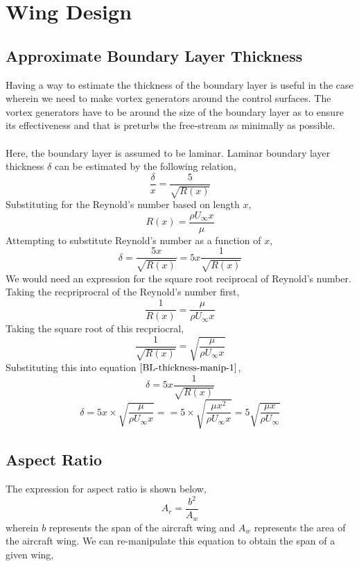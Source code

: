 \section{Wing Design}
\begin{comment}
\end{comment}

\subsection{Approximate Boundary Layer Thickness}
\begin{comment}
\end{comment}
Having a way to estimate the thickness of the boundary layer is useful in the case wherein we need to make vortex generators around the control surfaces. The vortex generators have to be around the size of the boundary layer as to ensure its effectiveness and that is preturbs the free-stream as minimally as possible.
\\~\\Here, the boundary layer is assumed to be laminar. Laminar boundary layer thickness $\delta$ can be estimated by the following relation,
$$\frac{\delta}{x} = \frac{5}{\sqrt{R(x)}}$$
Substituting for the Reynold's number based on length $x$,
$$R(x) = \frac{\rho U_{\infty} x}{\mu}$$
Attempting to substitute Reynold's number as a function of $x$,
\begin{equation}\delta = \frac{5x}{\sqrt{R(x)}} = 5x\frac{1}{\sqrt{R(x)}} \label{BL-thickness-manip-1}\end{equation}
We would need an expression for the square root reciprocal of Reynold's number. Taking the recpriprocral of the Reynold's number first,
$$\frac{1}{R(x)} = \frac{\mu}{\rho U_{\infty} x}$$
Taking the square root of this recpriocral,
$$\frac{1}{\sqrt{R(x)}} = \sqrt{\displaystyle \frac{\mu}{\rho U_{\infty} x}}$$
Substituting this into equation $\ref{BL-thickness-manip-1}$,
$$\delta = 5x\frac{1}{\sqrt{R(x)}} $$
$$\delta = 5x\times \sqrt{\displaystyle \frac{\mu}{\rho U_{\infty} x}} =  = 5\times \sqrt{\displaystyle \frac{\mu x^{2}}{\rho U_{\infty} x}} = 5\sqrt{\displaystyle \frac{\mu x}{\rho U_{\infty}}} $$

\subsection{Aspect Ratio}
\begin{comment}
$$A_{w} A_{r} = b^{2}$$
\begin{equation}b = \sqrt{A_{w} A_{r}} \label{span-length}\end{equation}
\end{comment}
The expression for aspect ratio is shown below,
\begin{equation}A_{r} = \frac{b^{2}}{A_{w}} \label{basic-def-aspect-ratio}\end{equation}
wherein $b$ represents the span of the aircraft wing and $A_{w}$ represents the area of the aircraft wing. We can re-manipulate this equation to obtain the span of a given wing,

